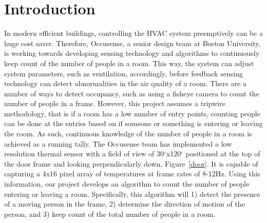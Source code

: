 \documentclass[12pt,oneside]{article} %
\begin{document}
\tableofcontents\bueceemptypage
\listoffigures\bueceemptypage
\listoftables\bueceemptypage

\buecereportheaders

\setcounter{page}{1}

\section{Introduction}  %
In modern efficient buildings, controlling the HVAC system preemptively can be a huge cost saver. Therefore, Occusense, a senior design team at Boston University, is working towards developing sensing technology and algorithms to continuously keep count of the number of people in a room. This way, the system can adjust system parameters, such as ventilation, accordingly, before feedback sensing technology can detect abnormalities in the air quality of a room. There are a number of ways to detect occupancy, such as using a fisheye camera to count the number of people in a frame. However, this project assumes a tripwire methodology, that is if a room has a low number of entry points, counting people can be done at the entries based on if someone or something is entering or leaving the room. As such, continuous knowledge of the number of people in a room is achieved as a running tally. The Occusense team has implemented a low resolution thermal sensor with a field of view of 30$^\circ$x120$^\circ$ positioned at the top of the door frame and looking perpendicularly down, Figure~\ref{door}. It is capable of capturing a 4x16 pixel array of temperatures at frame rates of 8-12Hz. Using this information, our project develops an algorithm to count the number of people entering or leaving a room. Specifically, this algorithm will 1) detect the presence of a moving person in the frame, 2) determine the direction of motion of the person, and 3) keep count of the total number of people in a room.
\end{document}
